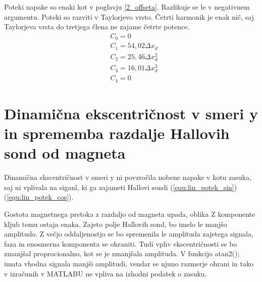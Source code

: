 Poteki napake so enaki kot v poglavju \ref{2_offseta}. Razlikuje se le v negativnem argumentu. Poteki so razviti v Taylorjevo vrsto. Četrti harmonik je enak nič, saj Taylorjeva vrsta do tretjega člena ne zajame četrte potence.
\begin{eqnarray}
&C_0 =0\\
&C_1 =54,02\Delta x_d\\     
&C_2 =25,46\Delta x_d^{2}\\             
&C_3 =16,01\Delta x_d^{3}\\         
&C_4 =0            
\end{eqnarray}
\section{Dinamična ekscentričnost v smeri y in sprememba razdalje Hallovih sond od magneta }
Dinamična ekscentričnost v smeri y ni povzročila nobene napake v kotu zasuka, saj ni vplivala na siganl, ki ga zajameti Hallovi sondi (\ref{equ:lin_potek_sin})(\ref{equ:lin_potek_cos}).

Gostota magnetnega pretoka z razdaljo od magneta upada, oblika Z komponente kljub temu ostaja enaka. Zajeto polje Hallovih sond, bo imelo le manjšo amplitudo. Z večjo oddaljenostjo se bo spremenila le amplituda zajetega signala, faza in enosmerna komponenta se ohraniti. Tudi vpliv ekscentričnosti se bo zmanjšal proprocionalno, kot se je zmanjšala amplituda. V funkcijo atan2(); imata vhodna signala manjši amplitudi, vendar se njuno razmerje ohrani in tako v izračunih v MATLABU ne vpliva na izhodni podatek o zasuku.